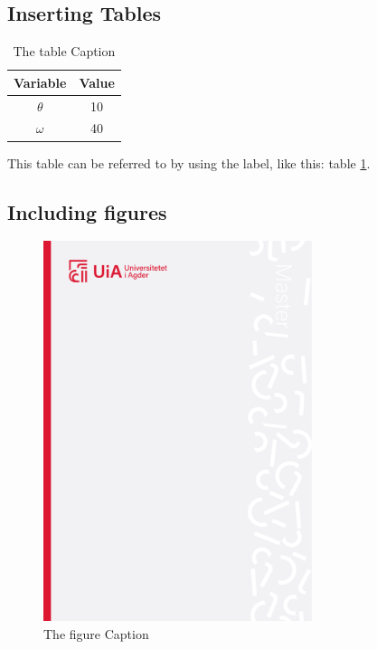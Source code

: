 \newpage

\subsection{Inserting Tables}

\begin{table}[H]
    \centering
    \begin{tabular}{c|c}
        Variable    &   Value   \\
        \hline
         $\theta$   &   10      \\
         $\omega$   &   40 
    \end{tabular}
    \caption{The table Caption}
    \label{tab:label1}
\end{table}

This table can be referred to by using the label, like this: table \ref{tab:label1}.


\subsection{Including figures}

\begin{figure}[H]
    \centering
    \includegraphics[width = 0.7\textwidth]{Figures/Frontpage/forside_master_nor.pdf}
    \caption{The figure Caption}
    \label{fig:label1}
\end{figure}

